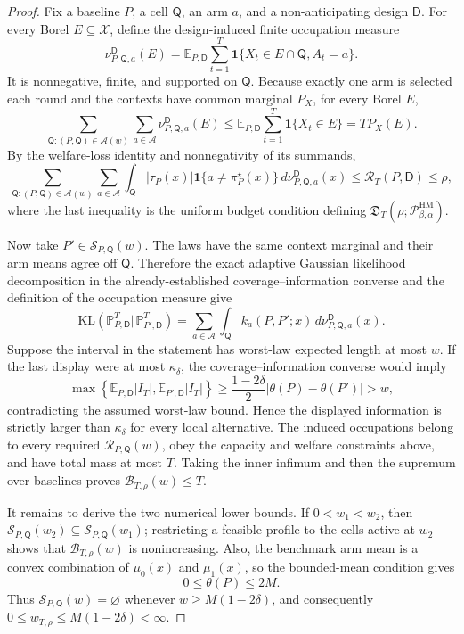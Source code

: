 \documentclass{article}
\begin{document}
\begin{proof}
Fix a baseline \(P\), a cell \(\mathsf Q\), an arm \(a\), and a non-anticipating design \(\mathsf D\).  For every Borel \(E\subseteq\mathcal X\), define the design-induced finite occupation measure
\[
\nu^{\mathsf D}_{P,\mathsf Q,a}(E)
=\mathbb E_{P,\mathsf D}\sum_{t=1}^T
\mathbf 1\{X_t\in E\cap\mathsf Q,A_t=a\}.
\]
It is nonnegative, finite, and supported on \(\mathsf Q\).  Because exactly one arm is selected each round and the contexts have common marginal \(P_X\), for every Borel \(E\),
\[
\sum_{\mathsf Q:(P,\mathsf Q)\in\mathscr A(w)}
\sum_{a\in\mathcal A}\nu^{\mathsf D}_{P,\mathsf Q,a}(E)
\le\mathbb E_{P,\mathsf D}\sum_{t=1}^T\mathbf 1\{X_t\in E\}
=T P_X(E).
\]
By the welfare-loss identity and nonnegativity of its summands,
\[
\sum_{\mathsf Q:(P,\mathsf Q)\in\mathscr A(w)}
\sum_{a\in\mathcal A}\int_{\mathsf Q}
|\tau_P(x)|\mathbf 1\{a\ne\pi_P^\star(x)\}
\,d\nu^{\mathsf D}_{P,\mathsf Q,a}(x)
\le\mathcal R_T(P,\mathsf D)\le\rho,
\]
where the last inequality is the uniform budget condition defining \(\mathfrak D_T(\rho;\mathcal P_{\beta,\alpha}^{\mathrm{HM}})\).

Now take \(P'\in\mathcal S_{P,\mathsf Q}(w)\).  The laws have the same context marginal and their arm means agree off \(\mathsf Q\).  Therefore the exact adaptive Gaussian likelihood decomposition in the already-established coverage--information converse and the definition of the occupation measure give
\[
\mathrm{KL}(\mathbb P_{P,\mathsf D}^{T}\Vert\mathbb P_{P',\mathsf D}^{T})
=\sum_{a\in\mathcal A}\int_{\mathsf Q}
k_a(P,P';x)\,d\nu^{\mathsf D}_{P,\mathsf Q,a}(x).
\]
Suppose the interval in the statement has worst-law expected length at most \(w\).  If the last display were at most \(\kappa_\delta\), the coverage--information converse would imply
\[
\max\left\{\mathbb E_{P,\mathsf D}|I_T|,
\mathbb E_{P',\mathsf D}|I_T|\right\}
\ge\frac{1-2\delta}{2}|\theta(P)-\theta(P')|>w,
\]
contradicting the assumed worst-law bound.  Hence the displayed information is strictly larger than \(\kappa_\delta\) for every local alternative.  The induced occupations belong to every required \(\mathcal R_{P,\mathsf Q}(w)\), obey the capacity and welfare constraints above, and have total mass at most \(T\).  Taking the inner infimum and then the supremum over baselines proves \(\mathcal B_{T,\rho}(w)\le T\).

It remains to derive the two numerical lower bounds.  If \(0<w_1<w_2\), then \(\mathcal S_{P,\mathsf Q}(w_2)\subseteq\mathcal S_{P,\mathsf Q}(w_1)\); restricting a feasible profile to the cells active at \(w_2\) shows that \(\mathcal B_{T,\rho}(w)\) is nonincreasing.  Also, the benchmark arm mean is a convex combination of \(\mu_0(x)\) and \(\mu_1(x)\), so the bounded-mean condition gives
\[
0\le\theta(P)\le2M.
\]
Thus \(\mathcal S_{P,\mathsf Q}(w)=\varnothing\) whenever \(w\ge M(1-2\delta)\), and consequently \(0\le w_{T,\rho}\le M(1-2\delta)<\infty\).


\end{proof}
\end{document}
